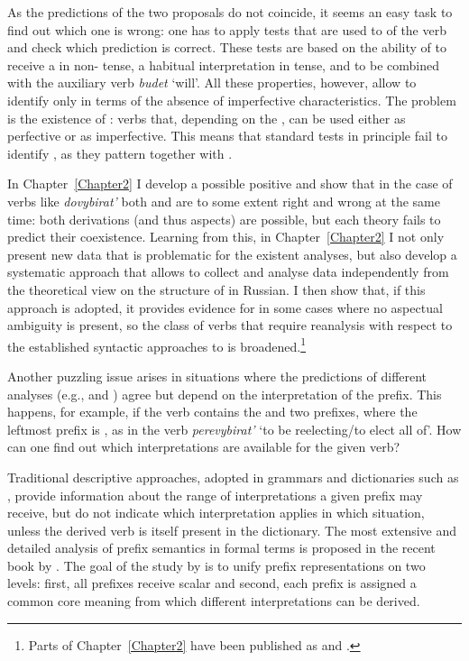 As the predictions of the two proposals do not coincide, it seems an easy task to find out which one is wrong: one has to apply tests that are used to  of the verb and check which prediction is correct. These tests are based on the ability of  to receive a  in non- tense, a habitual interpretation in  tense, and to be combined with the auxiliary verb \textit{budet} `will'. All these properties, however, allow to identify  only in terms of the absence of imperfective characteristics. The problem is the existence of : verbs that, depending on the , can be used either as perfective or as imperfective. This means that standard tests in principle fail to identify , as they pattern together with .

In Chapter~\ref{Chapter2} I develop a possible positive  and show that in the case of verbs like \textit{dovybirat'} both \citet{Svenonius:04b} and \citet{Tatevosov:07} are to some extent right and wrong at the same time: both derivations (and thus aspects) are possible, but each theory fails to predict their coexistence. Learning from this, in Chapter~\ref{Chapter2} I not only present new data that is problematic for the existent analyses, but also develop a systematic approach that allows to collect and analyse data independently from the theoretical view on the structure of  in Russian. I then show that, if this approach is adopted, it provides evidence for  in some cases where no aspectual ambiguity is present, so the class of verbs that require reanalysis with respect to the established syntactic approaches to  is broadened.\footnote{Parts of Chapter~\ref{Chapter2} have been published as \citealt{ZinovaFilip:13} and \citealt{ZinovaOsswald:paper}.}

Another puzzling issue arises in situations where the predictions of different analyses (e.g., \citealt{Svenonius:04b} and \citealt{Tatevosov:07}) agree but depend on the interpretation of the prefix. This happens, for example, if the verb contains the  and two prefixes, where the leftmost prefix is , as in the verb \textit{perevybirat'} `to be reelecting/to elect all of'. How can one find out which interpretations are available for the given verb? 

\hspace*{-0.64717pt}Traditional descriptive approaches, adopted in grammars and dictionaries such as \citet{Shvedova:82}, provide information about the range of interpretations a given prefix may receive, but do not indicate which interpretation applies in which situation, unless the derived verb is itself present in the dictionary. The most extensive and detailed analysis of prefix semantics in formal terms is proposed in the recent book by \citet{Kagan:book}. The goal of the study by \citet{Kagan:book} is to unify prefix representations on two levels: first, all prefixes receive scalar  and second, each prefix is assigned a common core meaning from which different interpretations can be derived. 

